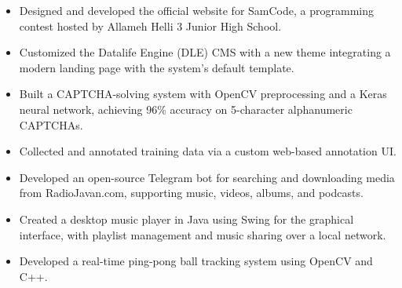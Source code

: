 \documentclass[11pt,letterpaper]{article}
\begin{document}
\begin{itemize}
  \item Designed and developed the official website for SamCode, a programming contest hosted by Allameh Helli 3 Junior High School.
  \item Customized the Datalife Engine (DLE) CMS with a new theme integrating a modern landing page with the system's default template.
\end{itemize}

\begin{itemize}
  \item Built a CAPTCHA-solving system with OpenCV preprocessing and a Keras neural network, achieving 96\% accuracy on 5-character alphanumeric CAPTCHAs.
  \item Collected and annotated training data via a custom web-based annotation UI.
\end{itemize}

\begin{itemize}
  \item Developed an open-source Telegram bot for searching and downloading media from RadioJavan.com, supporting music, videos, albums, and podcasts.
\end{itemize}

\begin{itemize}
  \item Created a desktop music player in Java using Swing for the graphical interface, with playlist management and music sharing over a local network.
\end{itemize}

\begin{itemize}
  \item Developed a real-time ping-pong ball tracking system using OpenCV and C++.
\end{itemize}
\end{document}
